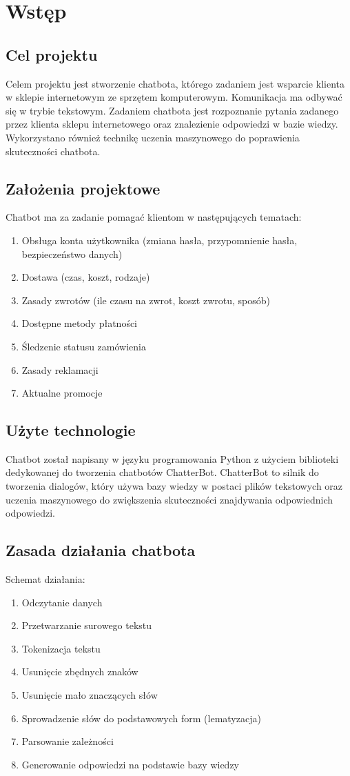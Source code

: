 \chapter{Wstęp}

\section{Cel projektu}
Celem projektu jest stworzenie chatbota, którego zadaniem jest wsparcie klienta w sklepie internetowym ze sprzętem komputerowym. Komunikacja ma odbywać się w trybie tekstowym. Zadaniem chatbota jest rozpoznanie pytania zadanego przez klienta sklepu internetowego oraz znalezienie odpowiedzi w bazie wiedzy. Wykorzystano również technikę uczenia maszynowego do poprawienia skuteczności chatbota.

\section{Założenia projektowe}
Chatbot ma za zadanie pomagać klientom w następujących tematach:
\begin{enumerate}
\item Obsługa konta użytkownika (zmiana hasła, przypomnienie hasła, bezpieczeństwo danych)
\item Dostawa (czas, koszt, rodzaje)
\item Zasady zwrotów (ile czasu na zwrot, koszt zwrotu, sposób)
\item Dostępne metody płatności
\item Śledzenie statusu zamówienia
\item Zasady reklamacji
\item Aktualne promocje
\end{enumerate}

\section{Użyte technologie}
Chatbot został napisany w języku programowania Python z użyciem biblioteki dedykowanej do tworzenia chatbotów ChatterBot. ChatterBot to silnik do tworzenia dialogów, który używa bazy wiedzy w postaci plików tekstowych oraz uczenia maszynowego do zwiększenia skuteczności znajdywania odpowiednich odpowiedzi.

\newpage

\section{Zasada działania chatbota}
Schemat działania:
\begin{enumerate}
\item Odczytanie danych
\item Przetwarzanie surowego tekstu
\item Tokenizacja tekstu
\item Usunięcie zbędnych znaków
\item Usunięcie mało znaczących słów
\item Sprowadzenie słów do podstawowych form (lematyzacja)
\item Parsowanie zależności
\item Generowanie odpowiedzi na podstawie bazy wiedzy
\end{enumerate}
